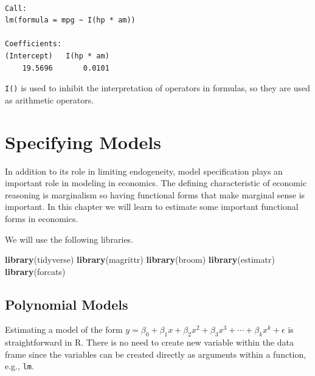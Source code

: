 \documentclass[]{book}
\newenvironment{Shaded}{\begin{snugshade}}{\end{snugshade}}
\newcommand{\KeywordTok}[1]{\textcolor[rgb]{0.13,0.29,0.53}{\textbf{#1}}}
\newcommand{\NormalTok}[1]{#1}
\newcommand{\OperatorTok}[1]{\textcolor[rgb]{0.81,0.36,0.00}{\textbf{#1}}}
\newcommand{\StringTok}[1]{\textcolor[rgb]{0.31,0.60,0.02}{#1}}
\begin{document}
\begin{Shaded}
\end{Shaded}

\begin{verbatim}

Call:
lm(formula = mpg ~ I(hp * am))

Coefficients:
(Intercept)   I(hp * am)  
    19.5696       0.0101  
\end{verbatim}

\texttt{I()} is used to inhibit the interpretation of operators in formulas, so they are used as arithmetic operators.

\hypertarget{chp7}{%
\chapter{Specifying Models}\label{chp7}}

In addition to its role in limiting endogeneity, model specification plays an important role in modeling in economics. The defining characteristic of economic reasoning is marginalism so having functional forms that make marginal sense is important. In this chapter we will learn to estimate some important functional forms in economics.

We will use the following libraries.

\begin{Shaded}
\begin{Highlighting}[]
\KeywordTok{library}\NormalTok{(tidyverse)}
\KeywordTok{library}\NormalTok{(magrittr)}
\KeywordTok{library}\NormalTok{(broom)}
\KeywordTok{library}\NormalTok{(estimatr)}
\KeywordTok{library}\NormalTok{(forcats)}
\end{Highlighting}
\end{Shaded}

\hypertarget{polynomial-models}{%
\section{Polynomial Models}\label{polynomial-models}}

Estimating a model of the form \(y=\beta_0+\beta_1x+\beta_2x^2+\beta_3x^3+\cdots+\beta_kx^k+\epsilon\) is straightforward in R. There is no need to create new variable within the data frame since the variables can be created directly as arguments within a function, e.g., \texttt{lm}.
\end{document}
